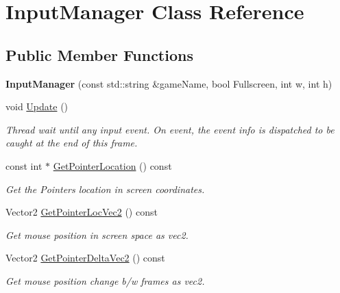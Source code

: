 \hypertarget{classInputManager}{}\section{Input\+Manager Class Reference}
\label{classInputManager}
\subsection*{Public Member Functions}
\begin{DoxyCompactItemize}
\item 
\mbox{\label{classInputManager_a1a93d570e7e9f4b64283a20185f01e3c}} 
{\bfseries Input\+Manager} (const std\+::string \&game\+Name, bool Fullscreen, int w, int h)
\item 
\mbox{\label{classInputManager_aa5480931dba2720e7d80dd00a53adae0}} 
void \hyperlink{classInputManager_aa5480931dba2720e7d80dd00a53adae0}{Update} ()
\begin{DoxyCompactList}\small\item\em Thread wait until any input event. On event, the event info is dispatched to be caught at the end of this frame. \end{DoxyCompactList}\item 
const int $\ast$ \hyperlink{classInputManager_ab8fb90f6385afb41d9d8212851c04061}{Get\+Pointer\+Location} () const
\begin{DoxyCompactList}\small\item\em Get the Pointer\textquotesingle{}s location in screen coordinates. \end{DoxyCompactList}\item 
Vector2 \hyperlink{classInputManager_a6d5e2b6637bb959377f218bb4b3d748e}{Get\+Pointer\+Loc\+Vec2} () const
\begin{DoxyCompactList}\small\item\em Get mouse position in screen space as vec2. \end{DoxyCompactList}\item 
Vector2 \hyperlink{classInputManager_a48091a18d5c514a1dc8226aa4b134b4d}{Get\+Pointer\+Delta\+Vec2} () const
\begin{DoxyCompactList}\small\item\em Get mouse position change b/w frames as vec2. \end{DoxyCompactList}\item 
\mbox{\label{classInputManager_a5f50a09fddead4a37e194e8fa75224fc}} 

\end{DoxyCompactItemize}
